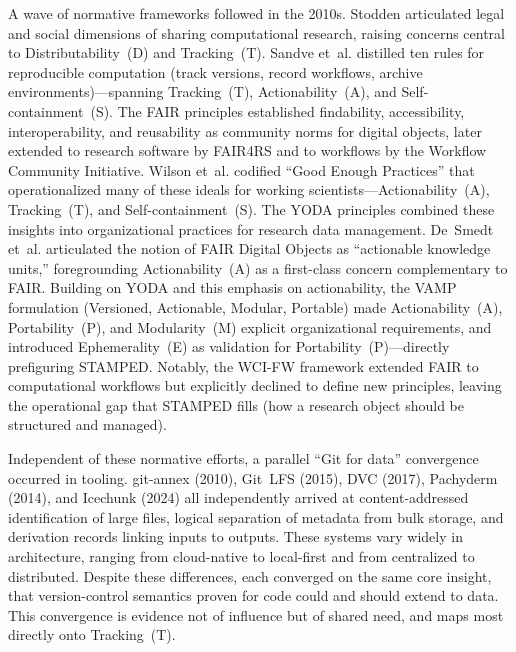 \documentclass{article}
\begin{document}
A wave of normative frameworks followed in the 2010s.
Stodden\cite{stodden_scientific_2010} articulated legal and social dimensions of sharing computational research, raising concerns central to Distributability~(D) and Tracking~(T).
Sandve et~al.\cite{sandve_ten_2013} distilled ten rules for reproducible computation (track versions, record workflows, archive environments)---spanning Tracking~(T), Actionability~(A), and Self-containment~(S).
The FAIR principles\cite{wilkinson_fair_2016} established findability, accessibility, interoperability, and reusability as community norms for digital objects, later extended to research software by FAIR4RS\cite{barker_introducing_2022} and to workflows by the Workflow Community Initiative\cite{wilkinson_applying_2025}.
Wilson et~al.\cite{wilson_good_2017} codified ``Good Enough Practices'' that operationalized many of these ideals for working scientists---Actionability~(A), Tracking~(T), and Self-containment~(S).
The YODA principles\cite{hanke_yoda_2018} combined these insights into organizational practices for research data management.
De~Smedt et~al.\cite{de_smedt_fair_2020} articulated the notion of FAIR Digital Objects as ``actionable knowledge units,'' foregrounding Actionability~(A) as a first-class concern complementary to FAIR.
Building on YODA and this emphasis on actionability, the VAMP formulation\cite{hanke_what_2023} (Versioned, Actionable, Modular, Portable) made Actionability~(A), Portability~(P), and Modularity~(M) explicit organizational requirements, and introduced Ephemerality~(E) as validation for Portability~(P)---directly prefiguring STAMPED.
Notably, the WCI-FW framework\cite{wilkinson_applying_2025} extended FAIR to computational workflows but explicitly declined to define new principles, leaving the operational gap  that STAMPED fills (how a research object should be structured and managed).

Independent of these normative efforts, a parallel ``Git for data'' convergence occurred in tooling.
git-annex (2010), Git~LFS (2015), DVC (2017), Pachyderm (2014), and Icechunk (2024) all independently arrived at content-addressed identification of large files, logical separation of metadata from bulk storage, and derivation records linking inputs to outputs.
These systems vary widely in architecture, ranging from cloud-native to local-first and from centralized to distributed.
Despite these differences, each converged on the same core insight, that version-control semantics proven for code could and should extend to data.
This convergence is evidence not of influence but of shared need, and maps most directly onto Tracking~(T).
\end{document}
